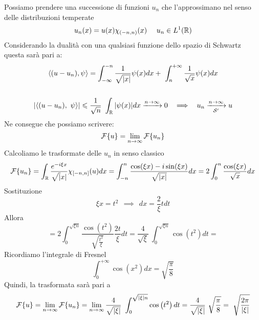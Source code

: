 Possiamo prendere una successione di funzioni $u_{n}$ che l'approssimano nel senso delle distribuzioni temperate
\begin{equation*}
u_{n}( x) =u( x) \chi _{( -n,n)}( x) \ \ \ \ u_{n} \in L^{1} (\RR  )
\end{equation*}
Considerando la dualità con una qualsiasi funzione dello spazio di Schwartz questa sarà pari a:
\begin{gather*}
\langle ( u-u_{n}) ,\psi \rangle =\int ^{-n}_{-\infty }\frac{1}{\sqrt{| x| }} \psi ( x) dx+\ \int ^{+\infty }_{n}\frac{1}{\sqrt{x}} \psi ( x) dx\\
\\
| \langle ( u-u_{n}) ,\ \psi \rangle | \leqslant \frac{1}{\sqrt{n}} \ \int _{\RR }| \psi ( x)| dx\xrightarrow{n\rightarrow \infty } 0\ \ \implies \ \ u_{n}\xrightarrow[\Sc  ']{n\rightarrow \infty } u
\end{gather*}
Ne consegue che possiamo scrivere:
\begin{equation*}
\mathcal{F} \{u\} =\lim _{n\rightarrow \infty }\mathcal{F} \{u_{n}\}
\end{equation*}
Calcoliamo le trasformate delle $u_{n}$ in senso classico
\begin{equation*}
\mathcal{F} \{u_{n}\} =\int _{\mathbb{R} }\frac{e^{-i\xi x}}{\sqrt{|} x|} \chi _{[-n,n]} (u)dx=\int ^{n}_{-n}\frac{\cos( \xi x) -i\sin (\xi x)}{\sqrt{| x| }} dx=2\int ^{n}_{0}\frac{\cos( \xi x)}{\sqrt{x}} dx
\end{equation*}
Sostituzione
\begin{equation*}
\xi x=t^{2} \ \ \implies \ \ dx=\frac{2}{\xi } tdt
\end{equation*}
Allora
\begin{equation*}
=2\int ^{\sqrt{\xi n}}_{0}\frac{\cos\left( t^{2}\right)}{\sqrt{\frac{t^{2}}{\xi }}}\frac{2t}{\xi } dt=\frac{4}{\sqrt{\xi }} \ \int ^{\sqrt{\xi n}}_{0}\cos\left( t^{2}\right) dt=
\end{equation*}
Ricordiamo l'integrale di Fresnel
\begin{equation*}
\int ^{+\infty }_{0}\cos\left( x^{2}\right) dx=\sqrt{\frac{\pi }{8}}
\end{equation*}
Quindi, la trasformata sarà pari a
\begin{equation*}
\Fc \{u\} =\lim _{n\rightarrow \infty }\Fc \{u_{n}\} =\lim _{n\rightarrow \infty }\frac{4}{\sqrt{| \xi | }} \ \int ^{\sqrt{| \xi | n}}_{0}\cos\left( t^{2}\right) dt=\frac{4}{\sqrt{| \xi | }} \ \sqrt{\frac{\pi }{8}} =\ \sqrt{\frac{2\pi }{| \xi | }}
\end{equation*}
